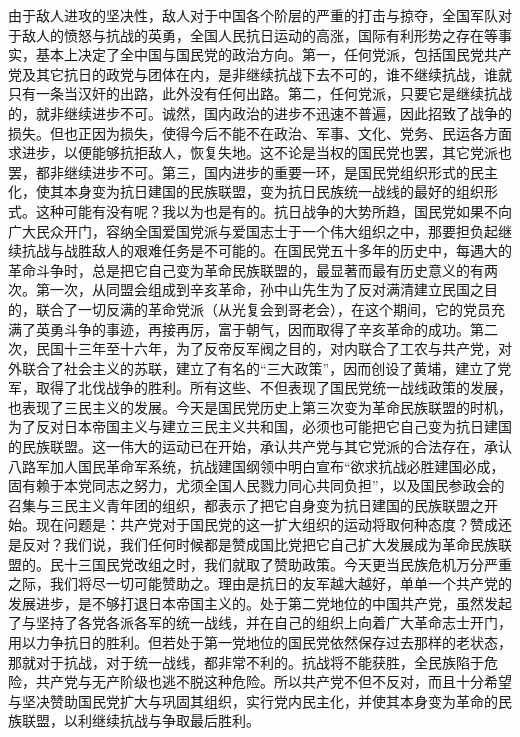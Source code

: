 \documentclass[UTF8, 12pt, a4paper]{ctexrep}
\begin{document}
由于敌人进攻的坚决性，敌人对于中国各个阶层的严重的打击与掠夺，全国军队对于敌人的愤怒与抗战的英勇，全国人民抗日运动的高涨，国际有利形势之存在等事实，基本上决定了全中国与国民党的政治方向。第一，任何党派，包括国民党共产党及其它抗日的政党与团体在内，是非继续抗战下去不可的，谁不继续抗战，谁就只有一条当汉奸的出路，此外没有任何出路。第二，任何党派，只要它是继续抗战的，就非继续进步不可。诚然，国内政治的进步不迅速不普遍，因此招致了战争的损失。但也正因为损失，使得今后不能不在政治、军事、文化、党务、民运各方面求进步，以便能够抗拒敌人，恢复失地。这不论是当权的国民党也罢，其它党派也罢，都非继续进步不可。第三，国内进步的重要一环，是国民党组织形式的民主化，使其本身变为抗日建国的民族联盟，变为抗日民族统一战线的最好的组织形式。这种可能有没有呢？我以为也是有的。抗日战争的大势所趋，国民党如果不向广大民众开门，容纳全国爱国党派与爱国志士于一个伟大组织之中，那要担负起继续抗战与战胜敌人的艰难任务是不可能的。在国民党五十多年的历史中，每遇大的革命斗争时，总是把它自己变为革命民族联盟的，最显著而最有历史意义的有两次。第一次，从同盟会组成到辛亥革命，孙中山先生为了反对满清建立民国之目的，联合了一切反满的革命党派（从光复会到哥老会），在这个期间，它的党员充满了英勇斗争的事迹，再接再厉，富于朝气，因而取得了辛亥革命的成功。第二次，民国十三年至十六年，为了反帝反军阀之目的，对内联合了工农与共产党，对外联合了社会主义的苏联，建立了有名的“三大政策”，因而创设了黄埔，建立了党军，取得了北伐战争的胜利。所有这些、不但表现了国民党统一战线政策的发展，也表现了三民主义的发展。今天是国民党历史上第三次变为革命民族联盟的时机，为了反对日本帝国主义与建立三民主义共和国，必须也可能把它自己变为抗日建国的民族联盟。这一伟大的运动已在开始，承认共产党与其它党派的合法存在，承认八路军加人国民革命军系统，抗战建国纲领中明白宣布“欲求抗战必胜建国必成，固有赖于本党同志之努力，尤须全国人民戮力同心共同负担”，以及国民参政会的召集与三民主义青年团的组织，都表示了把它自身变为抗日建国的民族联盟之开始。现在问题是：共产党对于国民党的这一扩大组织的运动将取何种态度？赞成还是反对？我们说，我们任何时候都是赞成国比党把它自己扩大发展成为革命民族联盟的。民十三国民党改组之时，我们就取了赞助政策。今天更当民族危机万分严重之际，我们将尽一切可能赞助之。理由是抗日的友军越大越好，单单一个共产党的发展进步，是不够打退日本帝国主义的。处于第二党地位的中国共产党，虽然发起了与坚持了各党各派各军的统一战线，并在自己的组织上向着广大革命志士开门，用以力争抗日的胜利。但若处于第一党地位的国民党依然保存过去那样的老状态，那就对于抗战，对于统一战线，都非常不利的。抗战将不能获胜，全民族陷于危险，共产党与无产阶级也逃不脱这种危险。所以共产党不但不反对，而且十分希望与坚决赞助国民党扩大与巩固其组织，实行党内民主化，并使其本身变为革命的民族联盟，以利继续抗战与争取最后胜利。
\end{document}
